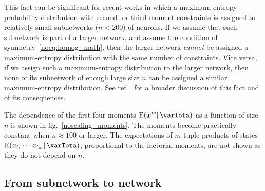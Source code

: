 \documentclass{article}
\theoremstyle{remark}
\theoremstyle{innote}
\newcommand*{\citep}{\parencites}
\renewcommand*{\|}{\mathpunct{|}}%
\newcommand*{\fig}{fig.}%
\newcommand*{\eg}{{e.g.}}
\newcommand*{\E}{\mathrm{E}}
\DeclarePairedDelimiter\expp{(}{)}
\newcommand*{\expe}{\E\expp}%
\theoremstyle{simple}
\newcommand*{\widebar}[1]{{\mkern1.5mu\skew{2}\overline{\mkern-1.5mu#1\mkern-1.5mu}\mkern 1.5mu}}
\newcommand*{\sav}{\widebar} %
\newcommand*{\yxx}{x}%
\newcommand*{\yx}{\bm{\yxx}}%
\newcommand*{\yxs}{\sav{\yx}}%
\newcommand*{\yH}{\varIota}
\begin{document}
This fact can be significant for recent works
\citep[\eg,][]{schneidmanetal2006,shlensetal2006,tkaciketal2006,marreetal2009,tkaciketal2009,ganmoretal2011,shimazakietal2012,tkaciketal2013,shimazakietal2015}
in which a maximum-entropy probability distribution with second- or
third-moment constraints is assigned to relatively small subnetworks
($n < 200$) of neurons. If we assume that such subnetwork is part of a
larger network, and assume the condition of symmetry~\eqref{noeq:homog_math},
then the larger network \emph{cannot} be assigned a maximum-entropy
distribution with the same number of constraints. Vice versa, if we assign
such a maximum-entropy distribution to the larger network, then none of its
subnetwork of enough large size $n$ can be assigned a similar
maximum-entropy distribution. See ref.~\citep{rostamietal2016} for a
broader discussion of this fact and of its consequences.

\medskip

The dependence of the first four moments $\expe{\yxs^m \| \yH}$ as a
function of size $n$ is shown in \fig~\ref{noscaling_moments}. The moments
become practically constant when $n \approx 100$ or larger. The
expectations of $m$-tuple products of states
$\expe{x_{i_1}\dotsm x_{i_m} \| \yH}$, proportional to the factorial
moments, are not shown as they do not depend on $n$.


\subsection{From subnetwork to network}
\label{nosec:from_sub_to_full}
\end{document}
